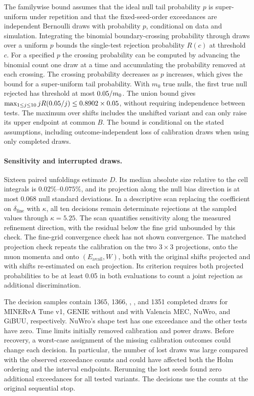 The familywise bound assumes that the ideal null tail probability $p$ is super-uniform under repetition and that the fixed-seed-order exceedances are independent Bernoulli draws with probability $p$, conditional on data and simulation. Integrating the binomial boundary-crossing probability through \jtBcap{} draws over a uniform $p$ bounds the single-test rejection probability $R(c)$ at threshold $c$. For a specified $p$ the crossing probability can be computed by advancing the binomial count one draw at a time and accumulating the probability removed at each crossing. The crossing probability decreases as $p$ increases, which gives the bound for a super-uniform tail probability. With $m_0$ true nulls, the first true null rejected has threshold at most $0.05/m_0$. The union bound gives $\max_{1\leq j\leq10} j R(0.05/j)\leq0.8902\times0.05$, without requiring independence between tests. The maximum over shifts includes the unshifted variant and can only raise its upper endpoint at common $B$. The bound is conditional on the stated assumptions, including outcome-independent loss of calibration draws when using only completed draws.

\paragraph{Sensitivity and interrupted draws.} Sixteen paired unfoldings estimate $D$. Its median absolute size relative to the cell integrals is $0.02\%$--$0.075\%$, and its projection along the null bias direction is at most 0.068 null standard deviations. In a descriptive scan replacing the coefficient \jtMoneKappa{} on $\delta_{\mathrm{fine}}$ with $\kappa$, all ten decisions remain determinate rejections at the sampled values through $\kappa=5.25$. The scan quantifies sensitivity along the measured refinement direction, with the residual below the fine grid unbounded by this check. The fine-grid convergence check has not shown convergence. The matched projection check repeats the calibration on the two $3\times 3$ projections, onto the muon momenta and onto $(E_{\mathrm{avail}},W)$, both with the original shifts projected and with shifts re-estimated on each projection. Its criterion requires both projected probabilities to be at least 0.05 in both evaluations to count a joint rejection as additional discrimination.

The decision samples contain 1365, 1366, \jtBmin{}, \jtBmax{}, and 1351 completed draws for MINERvA Tune v1, GENIE without and with Valencia MEC, NuWro, and GiBUU, respectively. NuWro's shape test has one exceedance and the other tests have zero. Time limits initially removed \jtLostCal{} calibration and \jtLostPow{} power draws. Before recovery, a worst-case assignment of the missing calibration outcomes could change each decision. In particular, the number of lost draws was large compared with the observed exceedance counts and could have affected both the Holm ordering and the interval endpoints. Rerunning the lost seeds found zero additional exceedances for all tested variants. The decisions use the counts at the original sequential stop.

